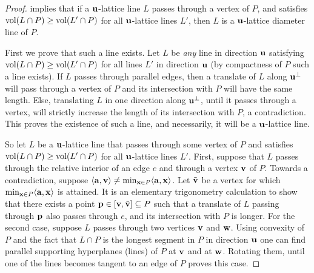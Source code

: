 \begin{proof}
     implies that if a $\mathbf{u}$-lattice line $L$ passes through a vertex of $P$, and satisfies $\operatorname{vol}(L\cap P) \geq \operatorname{vol}(L' \cap P)$ for all $\mathbf{u}$-lattice lines $L'$, then $L$ is a $\mathbf{u}$-lattice diameter line of $P$.

    First we prove that such a line exists. Let $L$ be \textit{any} line in direction $\mathbf{u}$ satisfying $\operatorname{vol}(L\cap P) \geq \operatorname{vol}(L' \cap P)$ for all lines $L'$ in direction $\mathbf{u}$ (by compactness of $P$ such a line exists). If $L$ passes through parallel edges, then a translate of $L$ along $\mathbf{u}^{\perp}$ will pass through a vertex of $P$ and its intersection with $P$ will have the same length. Else, translating $L$ in one direction along $\mathbf{u}^{\perp}$, until it passes through a vertex, will strictly increase the length of its intersection with $P$, a contradiction. This proves the existence of such a line, and necessarily, it will be a $\mathbf{u}$-lattice line.
    
    So let $L$ be a $\mathbf{u}$-lattice line that passes through some vertex of $P$ and satisfies
    $\operatorname{vol}(L\cap P) \geq \operatorname{vol}(L' \cap P)$ for all $\mathbf{u}$-lattice lines $L'$.
    First, suppose that $L$ passes through the relative interior of an edge $e$ and through a vertex $\mathbf{v}$ of $P$. Towards a contradiction, suppose $\langle \mathbf{a}, \mathbf{v} \rangle \neq \min_{\mathbf{x} \in P} \langle \mathbf{a},\mathbf{x} \rangle$. Let $\tilde{\mathbf{v}}$ be a vertex for which $\min_{\mathbf{x} \in P} \langle \mathbf{a},\mathbf{x} \rangle$ is attained. It is an elementary trigonometry calculation to show that there exists a point $\mathbf{p} \in [\mathbf{v},\tilde{\mathbf{v}}] \subseteq P$ such that a translate of $L$ passing through $\mathbf{p}$ also passes through $e$, and its intersection with $P$ is longer.
    For the second case, suppose $L$ passes through two vertices $\mathbf{v}$ and $\mathbf{w}$. Using convexity of $P$ and the fact that $L \cap P$ is the longest segment in $P$ in direction $\mathbf{u}$ one can find parallel supporting hyperplanes (lines) of $P$ at $\mathbf{v}$ and at $\mathbf{w}$. Rotating them, until one of the lines becomes tangent to an edge of $P$ proves this case.
\end{proof}

%

